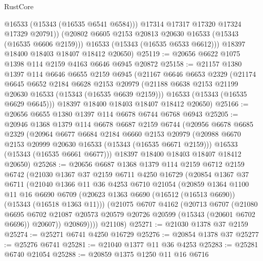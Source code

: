 \begin{lexlean}{RustCore}
\begin{coremodule}
              @16533
              (@15343 (@16535 @6541 @6584)))
            @17314
            @17317
            @17320
            @17324
            @17329
            @20791))
        (@20802 @6605 @2153 @20813 @20630 @16533 (@15343 (@16535 @6606 @2159)))
        @16533
        (@15343 (@16535 @6533 @6612)))
      @18397
      @18400
      @18403
      @18407
      @18412
      @20650)
@25119 := @20656 @6622 @1075 @1398 @114 @2159 @4163 @6646 @6945 @20872
@25158 := @21157
    @1380
    @1397
    @114
    @6646
    @6655
    @2159
    @6945
    (@21167
      @6646
      @6653
      @2329
      (@21174
        @6645
        @6652
        @2184
        @6628
        @2153
        @20979
        (@21188 @6638 @2153 @21199 @20630 @16533 (@15343 (@16535 @6639 @2159)))
        @16533
        (@15343 (@16535 @6629 @6645)))
      @18397
      @18400
      @18403
      @18407
      @18412
      @20650)
@25166 := @20656 @6655 @1380 @1397 @114 @6678 @6744 @6768 @6943
@25205 := @20946
    @1368
    @1379
    @114
    @6678
    @6687
    @2159
    @6744
    (@20956
      @6678
      @6685
      @2329
      (@20964
        @6677
        @6684
        @2184
        @6660
        @2153
        @20979
        (@20988 @6670 @2153 @20999 @20630 @16533 (@15343 (@16535 @6671 @2159)))
        @16533
        (@15343 (@16535 @6661 @6677)))
      @18397
      @18400
      @18403
      @18407
      @18412
      @20650)
@25268 := @20656
    @6687
    @1368
    @1379
    @114
    @2159
    @6712
    @2159
    @6742
    (@21030
      @1367
      @37
      @2159
      @6711
      @4250
      @16729
      (@20854
        @1367
        @37
        @6711
        (@21040
          @1366
          @11
          @36
          @4253
          @6710
          @21054
          (@20859
            @1364
            @1100
            @11
            @16
            @6690
            @6709
            (@20623 @1363 @6690 (@16512 (@16513 @6690)) (@15343 (@16518 @1363 @11)))
            (@21075
              @6707
              @4162
              (@20713
                @6707
                (@21080
                  @6695
                  @6702
                  @21087
                  @20573
                  @20579
                  @20726
                  @20599
                  (@15343 (@20601 @6702 @6696))
                  @20607))
              @20869))))
      @21108)
@25271 := @21030 @1378 @37 @2159
@25274 := @25271 @6741 @4250 @16729
@25276 := @20854 @1378 @37
@25277 := @25276 @6741
@25281 := @21040 @1377 @11 @36 @4253
@25283 := @25281 @6740 @21054
@25288 := @20859 @1375 @1250 @11 @16 @6716

\end{coremodule}
\end{lexlean}
